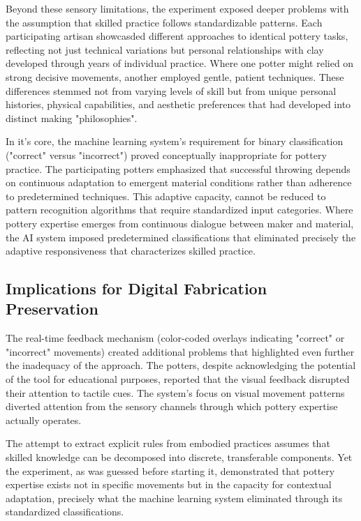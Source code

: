 \vspace{0.5cm}

Beyond these sensory limitations, the experiment exposed deeper problems with the assumption that skilled practice follows standardizable patterns. Each participating artisan showcasded different approaches to identical pottery tasks, reflecting not just technical variations but personal relationships with clay developed through years of individual practice. Where one potter might relied on strong decisive movements, another employed gentle, patient techniques. These differences stemmed not from varying levels of skill but from unique personal histories, physical capabilities, and aesthetic preferences that had developed into distinct making "philosophies".

\vspace{0.5cm}

In it's core, the machine learning system's requirement for binary classification ("correct" versus "incorrect") proved conceptually inappropriate for pottery practice. The participating potters emphasized that successful throwing depends on continuous adaptation to emergent material conditions rather than adherence to predetermined techniques. This adaptive capacity, cannot be reduced to pattern recognition algorithms that require standardized input categories. Where pottery expertise emerges from continuous dialogue between maker and material, the AI system imposed predetermined classifications that eliminated precisely the adaptive responsiveness that characterizes skilled practice.

\subsection{Implications for Digital Fabrication Preservation}

The real-time feedback mechanism (color-coded overlays indicating "correct" or "incorrect" movements) created additional problems that highlighted even further the inadequacy of the approach. The potters, despite acknowledging the potential of the tool for educational purposes, reported that the visual feedback disrupted their attention to tactile cues. The system's focus on visual movement patterns diverted attention from the sensory channels through which pottery expertise actually operates.

\vspace{0.5cm}

The attempt to extract explicit rules from embodied practices assumes that skilled knowledge can be decomposed into discrete, transferable components. Yet the experiment, as was guessed before starting it, demonstrated that pottery expertise exists not in specific movements but in the capacity for contextual adaptation, precisely what the machine learning system eliminated through its standardized classifications.


